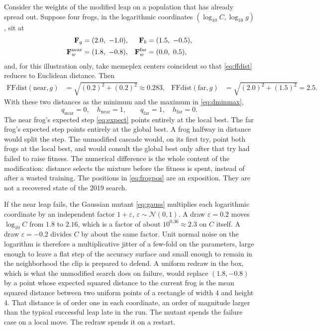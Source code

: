 Consider the weights of the modified leap on a population that has already spread out.
Suppose four frogs, in the logarithmic coordinates \((\log_{10} C, \log_{10} g)\), sit at
\begin{equation}
\begin{aligned}
\mathbf{F}_{g}&=(2.0,\ -1.0),&
\mathbf{F}_{b}&=(1.5,\ -0.5),\\
\mathbf{F}_{w}^{\mathrm{near}}&=(1.8,\ -0.8),&
\mathbf{F}_{w}^{\mathrm{far}}&=(0.0,\ 0.5),
\end{aligned}
\label{eq:frogpos}
\end{equation}
and, for this illustration only, take memeplex centers coincident so that \eqref{eq:ffdist} reduces to Euclidean distance.
Then
\begin{align}
\mathrm{FFdist}(\mathrm{near}, g)&=\sqrt{(0.2)^{2}+(0.2)^{2}}\approx 0.283,&
\mathrm{FFdist}(\mathrm{far}, g)&=\sqrt{(2.0)^{2}+(1.5)^{2}}=2.5.
\label{eq:frogdist}
\end{align}
With these two distances as the minimum and the maximum in \eqref{eq:dminmax},
\begin{equation}
q_{\mathrm{near}}=0,
\quad h_{\mathrm{near}}=1,
\qquad
q_{\mathrm{far}}=1,
\quad h_{\mathrm{far}}=0.
\label{eq:qhex}
\end{equation}
The near frog's expected step \eqref{eq:expect} points entirely at the local best.
The far frog's expected step points entirely at the global best.
A frog halfway in distance would split the step.
The unmodified cascade would, on its first try, point both frogs at the local best, and would consult the global best only after that try had failed to raise fitness.
The numerical difference is the whole content of the modification: distance selects the mixture before the fitness is spent, instead of after a wasted training.
The positions in \eqref{eq:frogpos} are an exposition.
They are not a recovered state of the 2019 search.

If the near leap fails, the Gaussian mutant \eqref{eq:gauss} multiplies each logarithmic coordinate by an independent factor \(1+\varepsilon\), \(\varepsilon\sim\mathcal{N}(0,1)\).
A draw \(\varepsilon=0.2\) moves \(\log_{10} C\) from \(1.8\) to \(2.16\), which is a factor of about \(10^{0.36}\approx 2.3\) on \(C\) itself.
A draw \(\varepsilon=-0.2\) divides \(C\) by about the same factor.
Unit normal noise on the logarithm is therefore a multiplicative jitter of a few-fold on the parameters, large enough to leave a flat step of the accuracy surface and small enough to remain in the neighborhood the clip is prepared to defend.
A uniform redraw in the box, which is what the unmodified search does on failure, would replace \((1.8,-0.8)\) by a point whose expected squared distance to the current frog is the mean squared distance between two uniform points of a rectangle of width \(4\) and height \(4\).
That distance is of order one in each coordinate, an order of magnitude larger than the typical successful leap late in the run.
The mutant spends the failure case on a local move.
The redraw spends it on a restart.


